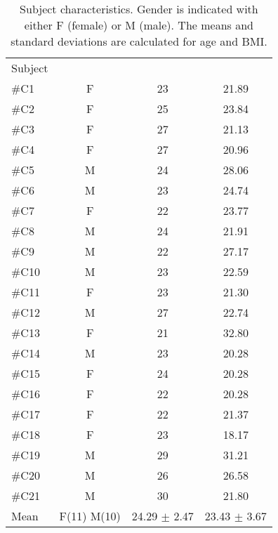 \begin{longtable}{l|c|c|c}
		\caption{Subject characteristics. Gender is indicated with either F (female) or M (male). The means and standard deviations are calculated for age and BMI.}
	\label{tab:subjectsB} \\
\cellcolor[HTML]{C0C0C0} {Subject} & 
\cellcolor[HTML]{C0C0C0}{Age} & \cellcolor[HTML]{C0C0C0}{Gender}  & \cellcolor[HTML]{C0C0C0}{BMI}  	\\  \rule{0pt}{3ex} 
\#C1 &  F & 23 & 21.89 \\ \hline \hline \rule{0pt}{3ex} 
\#C2 & F & 25 & 23.84 \\ \hline \hline \rule{0pt}{3ex} 
\#C3 & F & 27 & 21.13 \\ \hline \hline \rule{0pt}{3ex} 
\#C4 & F & 27 & 20.96\\ \hline \hline \rule{0pt}{3ex} 
\#C5 & M & 24 & 28.06 \\ \hline \hline \rule{0pt}{3ex} 
\#C6 & M & 23 &  24.74 \\ \hline \hline \rule{0pt}{3ex} 
\#C7 & F & 22 & 23.77 \\ \hline \hline \rule{0pt}{3ex} 
	\#C8 & M & 24 & 21.91 \\ \hline \hline \rule{0pt}{3ex} 
	\#C9 & M & 22 & 27.17  \\ \hline \hline \rule{0pt}{3ex} 
	\#C10 & M & 23 &  22.59 \\ \hline \hline \rule{0pt}{3ex} 
\#C11 & F & 23  & 21.30 \\ \hline \hline \rule{0pt}{3ex} 
\#C12 & M & 27 & 22.74 \\ \hline \hline \rule{0pt}{3ex} 
\#C13 & F  & 21 & 32.80  \\ \hline \hline \rule{0pt}{3ex} 
\#C14 & M &  23 & 20.28 \\ \hline \hline \rule{0pt}{3ex} 
\#C15 & F & 24 &  20.28 \\ \hline \hline \rule{0pt}{3ex} 
	\#C16 & F & 22  & 20.28 \\ \hline \hline \rule{0pt}{3ex} 
	\#C17 & F  & 22 &  21.37\\ \hline \hline \rule{0pt}{3ex} 
	\#C18 & F & 23  & 18.17   \\ \hline \hline \rule{0pt}{3ex}
		\#C19 &  M & 29 & 31.21 \\ \hline \hline \rule{0pt}{3ex} 
	\#C20 & M & 26 & 26.58  \\ \hline \hline \rule{0pt}{3ex}  	
	\#C21 & M & 30 & 21.80  \\ \hline \hline \rule{0pt}{3ex}  
Mean & F(11) M(10) & 24.29 $\pm$ 2.47 & 23.43 $\pm$ 3.67
	\\ \hline 	
\end{longtable}
\vspace{-.5cm}
